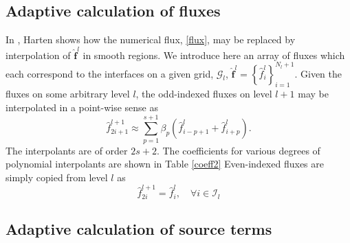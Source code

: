 \documentclass[]{article}
\begin{document}
%

    \subsection{Adaptive calculation of fluxes}

        In \cite{harten1994}, Harten shows how the numerical flux, \ref{flux},
        may be replaced by interpolation of $\hat{\bm{f}}^{l}$ in smooth
        regions. We introduce here an array of fluxes which each correspond to
        the interfaces on a given grid, $\bm{\mathcal{G}}_{l}$,
        $\hat{\bm{f}}^{l} = \left\{ \hat{f}^{l}_{i} \right\}_{i=1}^{N_{l}+1}$.
        Given the fluxes on some arbitrary level $l$, the odd-indexed fluxes on level $l+1$
        may be interpolated in a point-wise sense as
        \begin{equation}
            \hat{f}_{2i+1}^{l+1} \approx \sum_{p=1}^{s+1} \beta_{p} \left(
            \hat{f}^{l}_{i-p+1} + \hat{f}^{l}_{i+p} \right).
        \end{equation}
        The interpolants are of order $2s+2$. The coefficients for
        various degrees of polynomial interpolants are shown in Table \ref{coeff2}
        Even-indexed fluxes are simply copied from level $l$ as
        \begin{equation}
            \hat{f}^{l+1}_{2i} = \hat{f}^{l}_{i}, \quad \forall i \in \bm{\mathcal{I}}_{l}
        \end{equation}

    \subsection{Adaptive calculation of source terms}
\end{document}
